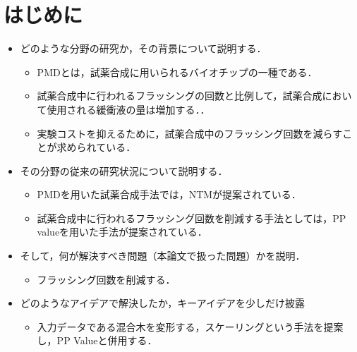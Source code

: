 \chapter{はじめに}
\begin{itemize}
 \setlength{\parskip}{0cm} %
 \setlength{\itemsep}{0cm} %
 \item どのような分野の研究か，その背景について説明する．
    \begin{itemize}
        \item PMDとは，試薬合成に用いられるバイオチップの一種である．
        \item 試薬合成中に行われるフラッシングの回数と比例して，試薬合成において使用される緩衝液の量は増加する．．
        \item 実験コストを抑えるために，試薬合成中のフラッシング回数を減らすことが求められている．
    \end{itemize}
 \item その分野の従来の研究状況について説明する．
     \begin{itemize}
        \item PMDを用いた試薬合成手法では，NTMが提案されている．
        \item 試薬合成中に行われるフラッシング回数を削減する手法としては，PP valueを用いた手法が提案されている．
    \end{itemize}

 \item そして，何が解決すべき問題（本論文で扱った問題）かを説明．
    \begin{itemize}
        \item フラッシング回数を削減する．
    \end{itemize}
 \item どのようなアイデアで解決したか，キーアイデアを少しだけ披露
    \begin{itemize}
        \item 入力データである混合木を変形する，スケーリングという手法を提案し，PP Valueと併用する．


\end{itemize}
\end{itemize}
